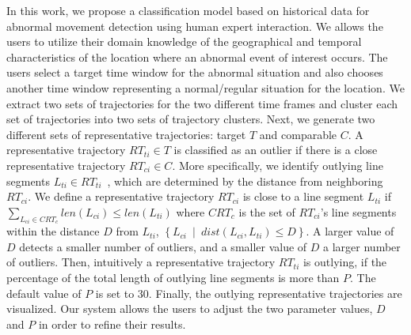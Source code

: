 In this work, we propose a classification model based on historical data for abnormal movement detection using human expert interaction.
We allows the users to utilize their domain knowledge of the geographical and temporal characteristics of the location where an abnormal event of interest occurs.
The users select a target time window for the abnormal situation and also chooses another time window representing a normal/regular situation for the location.
We extract two sets of trajectories for the two different time frames and cluster each set of trajectories into two sets of trajectory clusters.
Next, we generate two different sets of representative trajectories: target $T$ and comparable $C$.
A representative trajectory $RT_{ti} \in T$ is classified as an outlier if there is a close representative trajectory $RT_{ci} \in C$.
More specifically, we identify outlying line segments $L_{ti} \in RT_{ti}$~\cite{Lee:2008:Trajectory}, which are determined by the distance from neighboring $RT_{ci}$.
We define a representative trajectory $RT_{ci}$ is close to a line segment $L_{ti}$ if $\sum_{L_{ci} \in CRT_{c}} len(L_{ci}) \leq len(L_{ti}) $ where $CRT_{c}$ is the set of $RT_{ci}$'s line segments within the distance $D$ from $L_{ti}$, $\left\{L_{ci} \enspace| \enspace dist(L_{ci}, L_{ti}) \leq D\right\}$. 
A larger value of $D$ detects a smaller number of outliers, and a smaller value of $D$ a larger number of outliers.
Then, intuitively a representative trajectory $RT_{ti}$ is outlying, if the percentage of the total length of outlying line segments is more than $P$. The default value of $P$ is set to 30.
Finally, the outlying representative trajectories are visualized.
Our system allows the users to adjust the two parameter values, $D$ and $P$ in order to refine their results.



